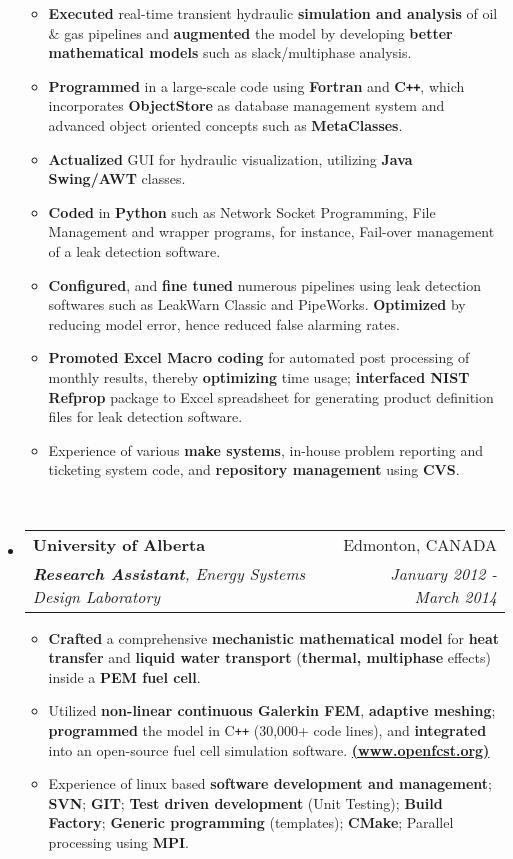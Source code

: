 \documentclass[letterpaper,11pt]{article}
\makeatletter
\newcommand{\resitem}[1]{\item #1 \vspace{-2pt}}
\newcommand{\ressubheading}[4]{
\begin{tabular*}{7.0in}{l@{\extracolsep{\fill}}r}
		\textbf{#1} & #2 \\
		\textit{#3} & \textit{#4} \\
\end{tabular*}\vspace{-6pt}}
\makeatother
\begin{document}
\begin{itemize}
	      \begin{itemize}
		      \resitem{{\small \textbf{Executed} real-time transient hydraulic \textbf{simulation and analysis} of oil \& gas pipelines and \textbf{augmented} the model by developing \textbf{better mathematical models} such as slack/multiphase analysis.}}
		      \resitem{{\small \textbf{Programmed} in a large-scale code using \textbf{Fortran} and \textbf{C\texttt{++}}, which incorporates \textbf{ObjectStore} as database management system and advanced object oriented concepts such as \textbf{MetaClasses}. }}
		      \resitem{{\small \textbf{Actualized} GUI for hydraulic visualization, utilizing \textbf{Java Swing/AWT} classes.}}
		      \resitem{{\small \textbf{Coded} in \textbf{Python} such as Network Socket Programming, File Management and wrapper programs, for instance, Fail-over management of a leak detection software. }}
		      \resitem{{\small \textbf{Configured}, and \textbf{fine tuned} numerous pipelines using leak detection softwares such as LeakWarn Classic and PipeWorks. \textbf{Optimized} by reducing model error, hence reduced false alarming rates.}}
		      \resitem{{\small \textbf{Promoted Excel Macro coding} for automated post processing of monthly results,  thereby \textbf{optimizing} time usage; \textbf{interfaced NIST Refprop} package to Excel spreadsheet for generating product definition files for leak detection software.}}
		      \resitem{{\small Experience of various \textbf{make systems}, in-house problem reporting and ticketing system code, and \textbf{repository management} using \textbf{CVS}.}}
	      \end{itemize} ~\\ \vspace{-10pt}
	\item
	      \ressubheading{University of Alberta}{Edmonton, CANADA}{\textbf{Research Assistant}, Energy Systems Design Laboratory}{January 2012 - March 2014}
	      \begin{itemize}
		      \resitem{{\small \textbf{Crafted} a comprehensive \textbf{mechanistic mathematical model} for \textbf{heat transfer} and \textbf{liquid water transport} (\textbf{thermal, multiphase} effects) inside a \textbf{PEM fuel cell}.}}
		      \resitem{{\small Utilized \textbf{non-linear continuous Galerkin FEM}, \textbf{adaptive meshing}; \textbf{programmed} the model in C\texttt{++} (30,000+ code lines), and \textbf{integrated} into an open-source fuel cell simulation software. \href{www.openfcst.org}{\textbf{(www.openfcst.org)}}}}
		      \resitem{{\small Experience of linux based \textbf{software development and management}; \textbf{SVN}; \textbf{GIT}; \textbf{Test driven development} (Unit Testing); \textbf{Build Factory}; \textbf{Generic programming} (templates); \textbf{CMake}; Parallel processing using \textbf{MPI}.}}

\end{itemize}
\end{itemize}
\end{document}
